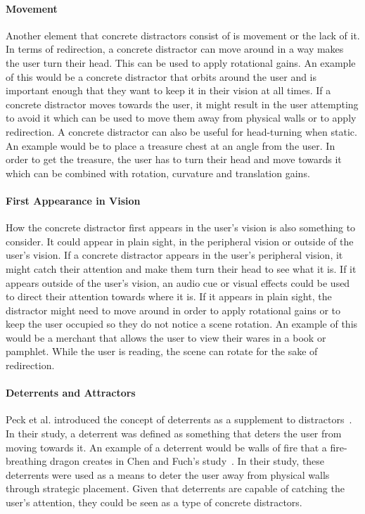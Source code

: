 \paragraph{Movement}
Another element that concrete distractors consist of is movement or the lack of it. In terms of redirection, a concrete distractor can move around in a way makes the user turn their head. This can be used to apply rotational gains. An example of this would be a concrete distractor that orbits around the user and is important enough that they want to keep it in their vision at all times. If a concrete distractor moves towards the user, it might result in the user attempting to avoid it which can be used to move them away from physical walls or to apply redirection. A concrete distractor can also be useful for head-turning when static. An example would be to place a treasure chest at an angle from the user. In order to get the treasure, the user has to turn their head and move towards it which can be combined with rotation, curvature and translation gains.

\paragraph{First Appearance in Vision}
How the concrete distractor first appears in the user's vision is also something to consider. It could appear in plain sight, in the peripheral vision or outside of the user's vision. If a concrete distractor appears in the user's peripheral vision, it might catch their attention and make them turn their head to see what it is. If it appears outside of the user's vision, an audio cue or visual effects could be used to direct their attention towards where it is. If it appears in plain sight, the distractor might need to move around in order to apply rotational gains or to keep the user occupied so they do not notice a scene rotation. An example of this would be a merchant that allows the user to view their wares in a book or pamphlet. While the user is reading, the scene can rotate for the sake of redirection. 
         
\paragraph{Deterrents and Attractors}
Peck et al. introduced the concept of deterrents as a supplement to distractors~\cite{peck2011evaluation}. In their study, a deterrent was defined as something that deters the user from moving towards it. An example of a deterrent would be walls of fire that a fire-breathing dragon creates in Chen and Fuch's study~\cite{chen2017supporting}. In their study, these deterrents were used as a means to deter the user away from physical walls through strategic placement. Given that deterrents are capable of catching the user's attention, they could be seen as a type of concrete distractors. 

